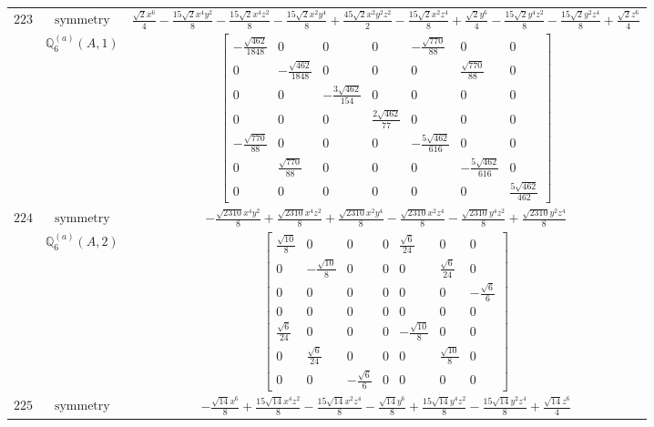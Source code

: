 \documentclass[fleqn,8pt,landscape]{jsarticle}
\begin{document}
\begin{longtable}{ccc}
$ 223 $ & $ \text{symmetry} $ & $ \frac{\sqrt{2} x^{6}}{4} - \frac{15 \sqrt{2} x^{4} y^{2}}{8} - \frac{15 \sqrt{2} x^{4} z^{2}}{8} - \frac{15 \sqrt{2} x^{2} y^{4}}{8} + \frac{45 \sqrt{2} x^{2} y^{2} z^{2}}{2} - \frac{15 \sqrt{2} x^{2} z^{4}}{8} + \frac{\sqrt{2} y^{6}}{4} - \frac{15 \sqrt{2} y^{4} z^{2}}{8} - \frac{15 \sqrt{2} y^{2} z^{4}}{8} + \frac{\sqrt{2} z^{6}}{4} $ \\
$  $ & $ \mathbb{Q}_{6}^{(a)}(A,1) $ & $ \begin{bmatrix} - \frac{\sqrt{462}}{1848} & 0 & 0 & 0 & - \frac{\sqrt{770}}{88} & 0 & 0 \\ 0 & - \frac{\sqrt{462}}{1848} & 0 & 0 & 0 & \frac{\sqrt{770}}{88} & 0 \\ 0 & 0 & - \frac{3 \sqrt{462}}{154} & 0 & 0 & 0 & 0 \\ 0 & 0 & 0 & \frac{2 \sqrt{462}}{77} & 0 & 0 & 0 \\ - \frac{\sqrt{770}}{88} & 0 & 0 & 0 & - \frac{5 \sqrt{462}}{616} & 0 & 0 \\ 0 & \frac{\sqrt{770}}{88} & 0 & 0 & 0 & - \frac{5 \sqrt{462}}{616} & 0 \\ 0 & 0 & 0 & 0 & 0 & 0 & \frac{5 \sqrt{462}}{462} \end{bmatrix} $ \\ \hline
$ 224 $ & $ \text{symmetry} $ & $ - \frac{\sqrt{2310} x^{4} y^{2}}{8} + \frac{\sqrt{2310} x^{4} z^{2}}{8} + \frac{\sqrt{2310} x^{2} y^{4}}{8} - \frac{\sqrt{2310} x^{2} z^{4}}{8} - \frac{\sqrt{2310} y^{4} z^{2}}{8} + \frac{\sqrt{2310} y^{2} z^{4}}{8} $ \\
$  $ & $ \mathbb{Q}_{6}^{(a)}(A,2) $ & $ \begin{bmatrix} \frac{\sqrt{10}}{8} & 0 & 0 & 0 & \frac{\sqrt{6}}{24} & 0 & 0 \\ 0 & - \frac{\sqrt{10}}{8} & 0 & 0 & 0 & \frac{\sqrt{6}}{24} & 0 \\ 0 & 0 & 0 & 0 & 0 & 0 & - \frac{\sqrt{6}}{6} \\ 0 & 0 & 0 & 0 & 0 & 0 & 0 \\ \frac{\sqrt{6}}{24} & 0 & 0 & 0 & - \frac{\sqrt{10}}{8} & 0 & 0 \\ 0 & \frac{\sqrt{6}}{24} & 0 & 0 & 0 & \frac{\sqrt{10}}{8} & 0 \\ 0 & 0 & - \frac{\sqrt{6}}{6} & 0 & 0 & 0 & 0 \end{bmatrix} $ \\ \hline
$ 225 $ & $ \text{symmetry} $ & $ - \frac{\sqrt{14} x^{6}}{8} + \frac{15 \sqrt{14} x^{4} z^{2}}{8} - \frac{15 \sqrt{14} x^{2} z^{4}}{8} - \frac{\sqrt{14} y^{6}}{8} + \frac{15 \sqrt{14} y^{4} z^{2}}{8} - \frac{15 \sqrt{14} y^{2} z^{4}}{8} + \frac{\sqrt{14} z^{6}}{4} $ \\

\end{longtable}
\end{document}

